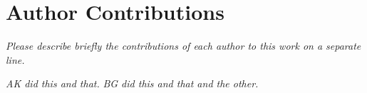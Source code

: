 \section{Author Contributions}


\textit{Please describe briefly the contributions of each author to this work on a separate line. }

\textit{AK did this and that.}
\textit{BG did this and that and the other. }
